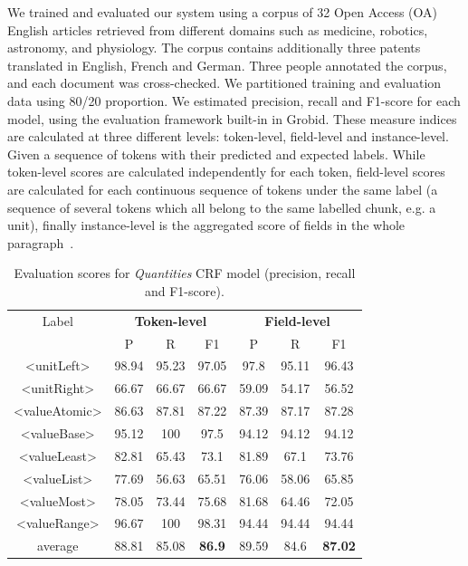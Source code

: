 \documentclass[sigconf]{acmart}
\begin{document}
We trained and evaluated our system using a corpus of 32 Open Access (OA) English articles retrieved from different domains such as medicine, robotics, astronomy, and physiology. The corpus contains additionally three patents translated in English, French and German. Three people annotated the corpus, and each document was cross-checked. We partitioned training and evaluation data using 80/20 proportion. We estimated precision, recall and F1-score for each model, using the evaluation framework built-in in Grobid. These measure indices are calculated at three different levels: token-level, field-level and instance-level. Given a sequence of tokens with their predicted and expected labels. While token-level scores are calculated independently for each token, field-level scores are calculated for each continuous sequence of tokens under the same label (a sequence of several tokens which all belong to the same labelled chunk, e.g. a unit), finally instance-level is the aggregated score of fields in the whole paragraph~\cite{foppiano2019proposal}. 

\begin{table}[ht]
   \caption{Evaluation scores for \textit{Quantities} CRF model (precision, recall and F1-score).}
   \label{tab:quantities-evaluation}
   \begin{tabular}{c|ccc|ccc}
       \toprule
       Label & \multicolumn{3}{c}{\textbf{Token-level}} & \multicolumn{3}{c}{\textbf{Field-level}}\\
        & P & R & F1 & P & R & F1 \\
       \midrule
       <unitLeft>    & 98.94 & 95.23 & 97.05 & 97.8  & 95.11 & 96.43\\
       <unitRight>   & 66.67 & 66.67 & 66.67 & 59.09 & 54.17 & 56.52\\
       <valueAtomic> & 86.63 & 87.81 & 87.22 & 87.39 & 87.17 & 87.28\\
       <valueBase>   & 95.12 & 100   & 97.5  & 94.12 & 94.12 & 94.12\\
       <valueLeast>  & 82.81 & 65.43 & 73.1  & 81.89 & 67.1  & 73.76\\
       <valueList>   & 77.69 & 56.63 & 65.51 & 76.06 & 58.06 & 65.85\\
       <valueMost>   & 78.05 & 73.44 & 75.68 & 81.68 & 64.46 & 72.05\\
       <valueRange>  & 96.67 & 100   & 98.31 & 94.44 & 94.44 & 94.44\\
       \midrule
       average       & 88.81  & 85.08 & \textbf{86.9} & 89.59 & 84.6 & \textbf{87.02}\\
       \bottomrule
   \end{tabular}
\end{table}
\end{document}
